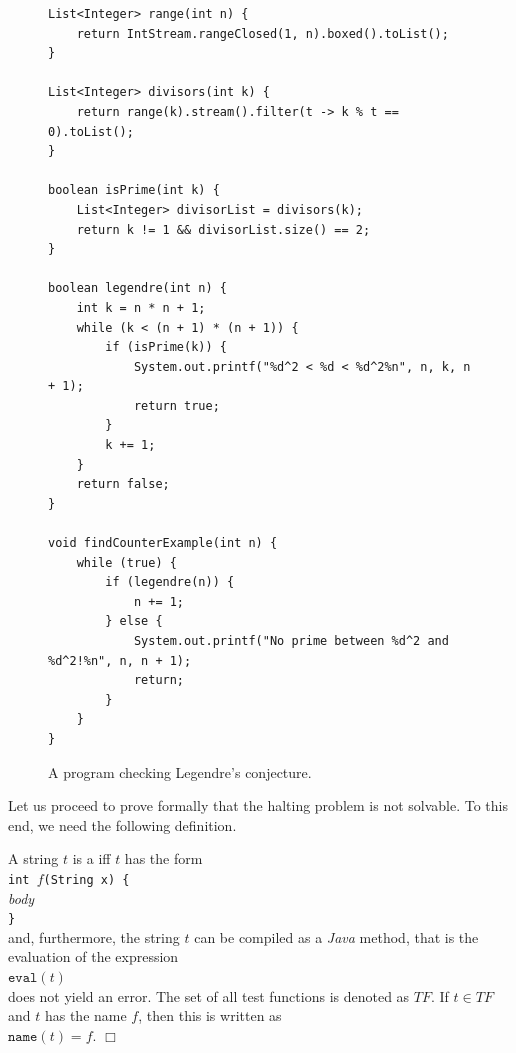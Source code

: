 \begin{figure}[!ht]
\centering
\begin{verbatim}
List<Integer> range(int n) {
    return IntStream.rangeClosed(1, n).boxed().toList();
}

List<Integer> divisors(int k) {
    return range(k).stream().filter(t -> k % t == 0).toList();
}

boolean isPrime(int k) {
    List<Integer> divisorList = divisors(k);
    return k != 1 && divisorList.size() == 2;
}

boolean legendre(int n) {
    int k = n * n + 1;
    while (k < (n + 1) * (n + 1)) {
        if (isPrime(k)) {
            System.out.printf("%d^2 < %d < %d^2%n", n, k, n + 1);
            return true;
        }
        k += 1;
    }
    return false;
}

void findCounterExample(int n) {
    while (true) {
        if (legendre(n)) {
            n += 1;
        } else {
            System.out.printf("No prime between %d^2 and %d^2!%n", n, n + 1);
            return;
        }
    }
}
\end{verbatim} 
\vspace*{-0.3cm}
\caption{A program checking Legendre's conjecture.}
\label{fig:legendre.stlx}
\end{figure}

Let us proceed to prove formally that the halting problem is not 
solvable.  To this end, we need the
following definition.


\begin{Definition} 
A string $t$ is a  
iff $t$ has the form \\[0.2cm]
\hspace*{1.3cm} \texttt{int $f$(String x) \{} \\
\hspace*{1.8cm} \textsl{body}        \\
\hspace*{1.3cm} \texttt{\}}         \\[0.2cm]
and, furthermore, the string $t$ can be compiled as a \textsl{Java} method, that is the evaluation of
the expression
\\[0.2cm]
\hspace*{1.3cm}
$\texttt{eval}(t)$
\\[0.2cm]
does not yield an error.
The set of all test functions is denoted as $T\!F$.
If $t \in T\!F$ and $t$ has the name $f$, then
this is written as 
\\[0.2cm]
\hspace*{1.3cm}
$\mathtt{name}(t) = f$.
\hspace*{\fill} $\Box$
\end{Definition}


